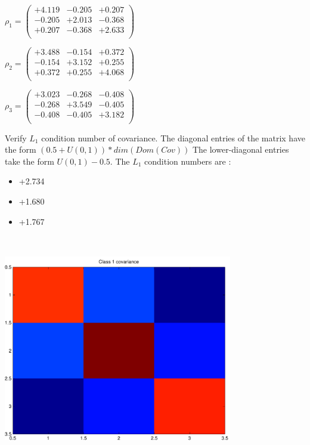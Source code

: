 \documentclass[9pt]{article}
\theoremstyle{plain}
\theoremstyle{definition}
\theoremstyle{remark}
\numberwithin{equation}{section}
\begin{document}
$\rho_1 = \left(
\begin{array}{
ccc}
+4.119 & -0.205 & +0.207 \\
-0.205 & +2.013 & -0.368 \\
+0.207 & -0.368 & +2.633 \\
\end{array}
\right)$ \newline 

$\rho_2 = \left(
\begin{array}{
ccc}
+3.488 & -0.154 & +0.372 \\
-0.154 & +3.152 & +0.255 \\
+0.372 & +0.255 & +4.068 \\
\end{array}
\right)$ \newline 

$\rho_3 = \left(
\begin{array}{
ccc}
+3.023 & -0.268 & -0.408 \\
-0.268 & +3.549 & -0.405 \\
-0.408 & -0.405 & +3.182 \\
\end{array}
\right)$ \newline 

Verify $L_1$ condition number of covariance. The diagonal entries of the matrix have the form $(0.5 + U(0,1) )*dim(Dom(Cov))$
The lower-diagonal entries take the form $U(0,1) - 0.5$. 
The $L_1$ condition numbers are :
\begin{itemize}
\item +2.734
\item +1.680
\item +1.767
\end{itemize}
\includegraphics[width=10.0cm,height=10.0cm]{rv1_corr.pdf}
\end{document}
